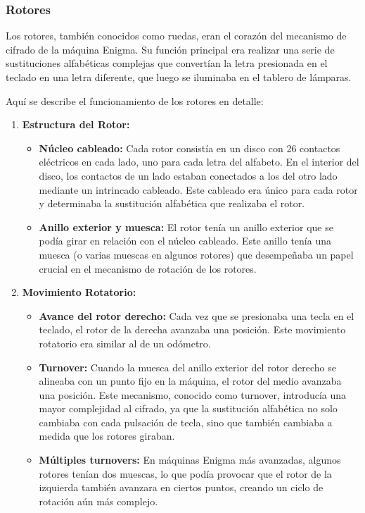 \documentclass{article}
\begin{document}
\subsubsection{Rotores}

Los rotores, también conocidos como ruedas, eran el corazón del mecanismo de cifrado de la máquina Enigma. 
Su función principal era realizar una serie de sustituciones alfabéticas complejas que convertían la letra 
presionada en el teclado en una letra diferente, que luego se iluminaba en el tablero de lámparas. \cite{Colossus1}\cite{AlanTuringEnigmaO}\cite{EnigmaC200s}

Aquí se describe el funcionamiento de los rotores en detalle:

\begin{enumerate}
    \item \textbf{Estructura del Rotor:}
    \begin{itemize}
        \item \textbf{Núcleo cableado:} Cada rotor consistía en un disco con 26 contactos eléctricos 
        en cada lado, uno para cada letra del alfabeto. En el interior del disco, los contactos de un 
        lado estaban conectados a los del otro lado mediante un intrincado cableado. Este cableado era 
        único para cada rotor y determinaba la sustitución alfabética que realizaba el rotor.
        \item \textbf{Anillo exterior y muesca:} El rotor tenía un anillo exterior que se podía girar en 
        relación con el núcleo cableado. Este anillo tenía una muesca (o varias muescas en algunos rotores) 
        que desempeñaba un papel crucial en el mecanismo de rotación de los rotores.
    \end{itemize}
    
    \item \textbf{Movimiento Rotatorio:}
    \begin{itemize}
        \item \textbf{Avance del rotor derecho:} Cada vez que se presionaba una tecla en el teclado, 
        el rotor de la derecha avanzaba una posición. Este movimiento rotatorio era similar al de un 
        odómetro.
        \item \textbf{Turnover:} Cuando la muesca del anillo exterior del rotor derecho se alineaba 
        con un punto fijo en la máquina, el rotor del medio avanzaba una posición. Este mecanismo, 
        conocido como turnover, introducía una mayor complejidad al cifrado, ya que la sustitución 
        alfabética no solo cambiaba con cada pulsación de tecla, sino que también cambiaba a medida 
        que los rotores giraban.
        \item \textbf{Múltiples turnovers:} En máquinas Enigma más avanzadas, algunos rotores tenían 
        dos muescas, lo que podía provocar que el rotor de la izquierda también avanzara en ciertos puntos, creando un ciclo de rotación aún más complejo.
    \end{itemize}


\end{enumerate}
\end{document}
